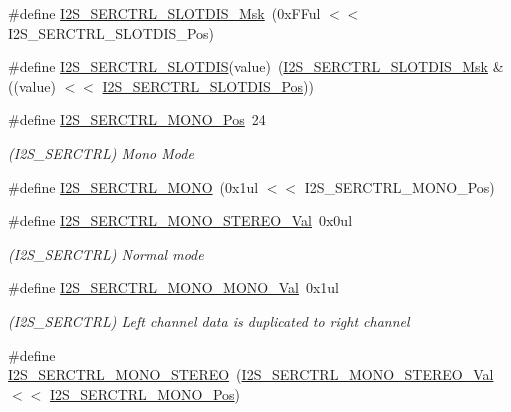 \begin{DoxyCompactItemize}
\#define \mbox{\hyperlink{group___s_a_m_d21___i2_s_ga2a1f8fbbc18ddf799f2f5c284c759824}{I2\+S\+\_\+\+S\+E\+R\+C\+T\+R\+L\+\_\+\+S\+L\+O\+T\+D\+I\+S\+\_\+\+Msk}}~(0x\+F\+Ful $<$$<$ I2\+S\+\_\+\+S\+E\+R\+C\+T\+R\+L\+\_\+\+S\+L\+O\+T\+D\+I\+S\+\_\+\+Pos)
\item 
\#define \mbox{\hyperlink{group___s_a_m_d21___i2_s_gaabd3ff3c321512eb9379664bf9b3cb5c}{I2\+S\+\_\+\+S\+E\+R\+C\+T\+R\+L\+\_\+\+S\+L\+O\+T\+D\+IS}}(value)~(\mbox{\hyperlink{group___s_a_m_d21___i2_s_ga2a1f8fbbc18ddf799f2f5c284c759824}{I2\+S\+\_\+\+S\+E\+R\+C\+T\+R\+L\+\_\+\+S\+L\+O\+T\+D\+I\+S\+\_\+\+Msk}} \& ((value) $<$$<$ \mbox{\hyperlink{group___s_a_m_d21___i2_s_ga52eeb2b64e10bd3e9f1249c5516e45ad}{I2\+S\+\_\+\+S\+E\+R\+C\+T\+R\+L\+\_\+\+S\+L\+O\+T\+D\+I\+S\+\_\+\+Pos}}))
\item 
\#define \mbox{\hyperlink{group___s_a_m_d21___i2_s_ga5fc00eb2e108b61763826073051c5659}{I2\+S\+\_\+\+S\+E\+R\+C\+T\+R\+L\+\_\+\+M\+O\+N\+O\+\_\+\+Pos}}~24
\begin{DoxyCompactList}\small\item\em (I2\+S\+\_\+\+S\+E\+R\+C\+T\+RL) Mono Mode \end{DoxyCompactList}\item 
\#define \mbox{\hyperlink{group___s_a_m_d21___i2_s_gaa12582b95348cdc9def7a696275c2c97}{I2\+S\+\_\+\+S\+E\+R\+C\+T\+R\+L\+\_\+\+M\+O\+NO}}~(0x1ul $<$$<$ I2\+S\+\_\+\+S\+E\+R\+C\+T\+R\+L\+\_\+\+M\+O\+N\+O\+\_\+\+Pos)
\item 
\#define \mbox{\hyperlink{group___s_a_m_d21___i2_s_ga72fc931ff5007dcfd6dc55f19a0520c1}{I2\+S\+\_\+\+S\+E\+R\+C\+T\+R\+L\+\_\+\+M\+O\+N\+O\+\_\+\+S\+T\+E\+R\+E\+O\+\_\+\+Val}}~0x0ul
\begin{DoxyCompactList}\small\item\em (I2\+S\+\_\+\+S\+E\+R\+C\+T\+RL) Normal mode \end{DoxyCompactList}\item 
\#define \mbox{\hyperlink{group___s_a_m_d21___i2_s_gab493924b2b9c0bbbb02a4607d2a3c891}{I2\+S\+\_\+\+S\+E\+R\+C\+T\+R\+L\+\_\+\+M\+O\+N\+O\+\_\+\+M\+O\+N\+O\+\_\+\+Val}}~0x1ul
\begin{DoxyCompactList}\small\item\em (I2\+S\+\_\+\+S\+E\+R\+C\+T\+RL) Left channel data is duplicated to right channel \end{DoxyCompactList}\item 
\#define \mbox{\hyperlink{group___s_a_m_d21___i2_s_gab635986a4fb5bc2e35cceecd2ab3e15e}{I2\+S\+\_\+\+S\+E\+R\+C\+T\+R\+L\+\_\+\+M\+O\+N\+O\+\_\+\+S\+T\+E\+R\+EO}}~(\mbox{\hyperlink{group___s_a_m_d21___i2_s_ga72fc931ff5007dcfd6dc55f19a0520c1}{I2\+S\+\_\+\+S\+E\+R\+C\+T\+R\+L\+\_\+\+M\+O\+N\+O\+\_\+\+S\+T\+E\+R\+E\+O\+\_\+\+Val}}   $<$$<$ \mbox{\hyperlink{group___s_a_m_d21___i2_s_ga5fc00eb2e108b61763826073051c5659}{I2\+S\+\_\+\+S\+E\+R\+C\+T\+R\+L\+\_\+\+M\+O\+N\+O\+\_\+\+Pos}})

\end{DoxyCompactItemize}
